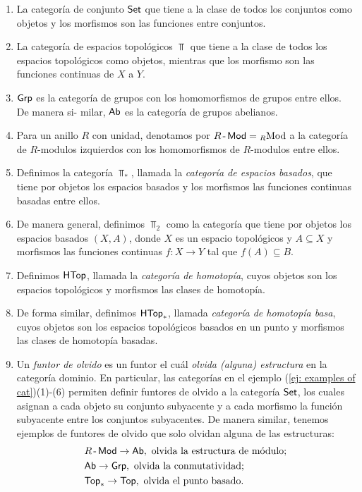 \begin{ejemplo}
\label{ej: examples of cat}
    \begin{enumerate}[label = (\arabic*)]
        \item La categoría de conjunto $\textsf{Set}$  que tiene a la clase de todos los conjuntos como objetos y los morfismos son las funciones entre conjuntos.
        \item La categoría de espacios topológicos $\Top$ que tiene a la clase de todos los espacios topológicos como objetos, mientras que los morfismo son las funciones continuas de $X$ a $Y$.
        \item $\textsf{Grp}$ es la categoría de grupos con los homomorfismos de grupos entre ellos. De manera si- milar, $\textsf{Ab}$ es la categoría de grupos abelianos.
        \item Para un anillo $R$ con unidad, denotamos por $\Mod={}_{R}\mathrm{Mod}$ a la categoría de $R$-modulos izquierdos con los homomorfismos de $R$-modulos entre ellos.
        \item Definimos la categoría $\Top_*$, llamada la \textit{categoría de espacios basados},
        que tiene por objetos los espacios basados y los morfismos las funciones continuas basadas entre ellos.
        \item De manera general, definimos $\Top_2$ como la categoría que tiene por objetos los espacios basados $(X,A)$, donde $X$ es un espacio topológicos y $A\subseteq X$ y morfismos las funciones continuas $f:X\to Y$ tal que $f(A)\subseteq B$.
        \item Definimos $\textsf{HTop}$, llamada la \textit{categoría de homotopía}, cuyos objetos son los espacios topológicos y morfismos las clases de homotopía. 
        \item De forma similar, definimos $\textsf{HTop}_*$, llamada \textit{categoría de homotopía basa}, cuyos objetos son los espacios topológicos basados en un punto y morfismos las clases de homotopía basadas.
        \item Un \textit{funtor de olvido} es un funtor el cuál \textit{olvida (alguna) estructura} en la categoría dominio. En particular, las categorías en el ejemplo (\ref{ej: examples of cat})(1)-(6) permiten definir funtores de olvido a la categoría $\textsf{Set}$, los cuales asignan a cada objeto su conjunto subyacente y a cada morfismo la función subyacente entre los conjuntos subyacentes. De manera similar, tenemos ejemplos de funtores de olvido que solo olvidan alguna de las estructuras:
    \begin{align*}
        &\Mod \to \Ab, \text{ olvida la estructura de módulo};\\
        &\Ab \to \Grp, \text{ olvida la conmutatividad};\\
        &\Top_* \to \Top, \text{ olvida el punto basado}.
    \end{align*}
    \end{enumerate}
    \end{ejemplo}
